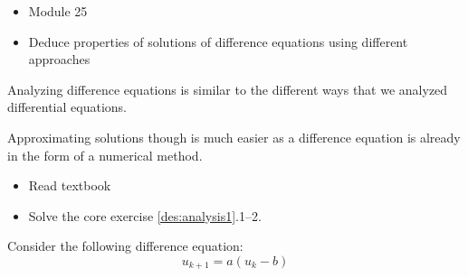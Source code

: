 \begin{lesson}

	\begin{itemize}
		\item Module 25
	\end{itemize}

	\begin{itemize}
		\item Deduce properties of solutions of difference equations using different approaches
	\end{itemize}
	


Analyzing difference equations is similar to the different ways that we analyzed differential equations.

Approximating solutions though is much easier as a difference equation is already in the form of a numerical method.

\begin{itemize}
	\item Read textbook
	\item Solve the core exercise \ref{des:analysis1}.1--2.
\end{itemize}

\end{lesson}




\question \label{des:analysis1}
	Consider the following difference equation:
		$$u_{k+1} = a(u_k - b)$$

